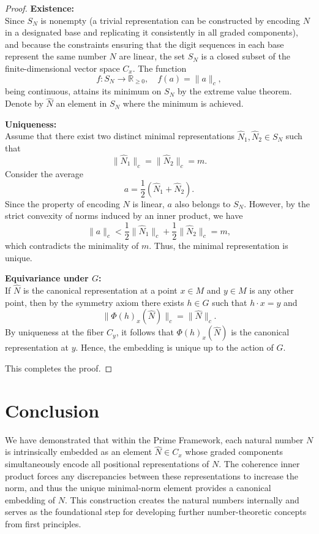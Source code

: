 \documentclass[12pt]{article}
\begin{document}
\begin{proof}
\textbf{Existence:}\\
Since \(S_N\) is nonempty (a trivial representation can be constructed by encoding \(N\) in a designated base and replicating it consistently in all graded components), and because the constraints ensuring that the digit sequences in each base represent the same number \(N\) are linear, the set \(S_N\) is a closed subset of the finite-dimensional vector space \(C_x\). The function
\[
f : S_N \to \mathbb{R}_{\ge 0}, \quad f(a) = \|a\|_c,
\]
being continuous, attains its minimum on \(S_N\) by the extreme value theorem. Denote by \(\hat{N}\) an element in \(S_N\) where the minimum is achieved.

\textbf{Uniqueness:}\\
Assume that there exist two distinct minimal representations \(\hat{N}_1, \hat{N}_2 \in S_N\) such that
\[
\|\hat{N}_1\|_c = \|\hat{N}_2\|_c = m.
\]
Consider the average
\[
a = \frac{1}{2}(\hat{N}_1 + \hat{N}_2).
\]
Since the property of encoding \(N\) is linear, \(a\) also belongs to \(S_N\). However, by the strict convexity of norms induced by an inner product, we have
\[
\|a\|_c < \frac{1}{2}\|\hat{N}_1\|_c + \frac{1}{2}\|\hat{N}_2\|_c = m,
\]
which contradicts the minimality of \(m\). Thus, the minimal representation is unique.

\textbf{Equivariance under \(G\):}\\
If \(\hat{N}\) is the canonical representation at a point \(x\in M\) and \(y\in M\) is any other point, then by the symmetry axiom there exists \(h\in G\) such that \(h\cdot x = y\) and
\[
\|\Phi(h)_x(\hat{N})\|_c = \|\hat{N}\|_c.
\]
By uniqueness at the fiber \(C_y\), it follows that \(\Phi(h)_x(\hat{N})\) is the canonical representation at \(y\). Hence, the embedding is unique up to the action of \(G\).

This completes the proof.
\end{proof}

\section{Conclusion}
We have demonstrated that within the Prime Framework, each natural number \(N\) is intrinsically embedded as an element \(\hat{N}\in C_x\) whose graded components simultaneously encode all positional representations of \(N\). The coherence inner product forces any discrepancies between these representations to increase the norm, and thus the unique minimal-norm element provides a canonical embedding of \(N\). This construction creates the natural numbers internally and serves as the foundational step for developing further number-theoretic concepts from first principles.
\end{document}
